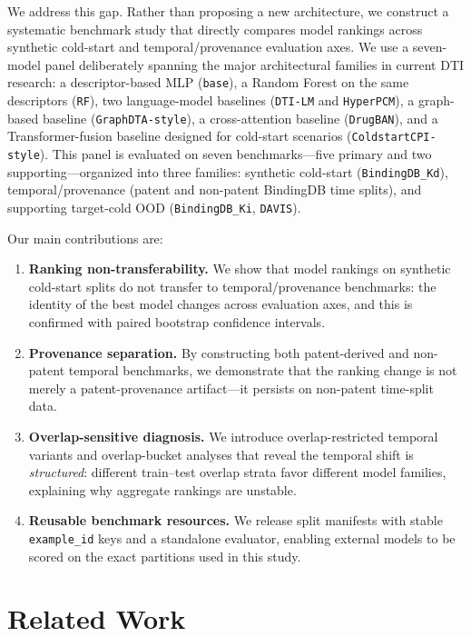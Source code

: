 \documentclass[referee,pdflatex,sn-basic,Numbered]{sn-jnl}
\begin{document}
We address this gap. Rather than proposing a new architecture, we construct a systematic benchmark study that directly compares model rankings across synthetic cold-start and temporal/provenance evaluation axes. We use a seven-model panel deliberately spanning the major architectural families in current DTI research: a descriptor-based MLP (\texttt{base}), a Random Forest on the same descriptors (\texttt{RF}), two language-model baselines (\texttt{DTI-LM} and \texttt{HyperPCM}), a graph-based baseline (\texttt{GraphDTA-style}), a cross-attention baseline (\texttt{DrugBAN}), and a Transformer-fusion baseline designed for cold-start scenarios (\texttt{ColdstartCPI-style}). This panel is evaluated on seven benchmarks—five primary and two supporting—organized into three families: synthetic cold-start (\texttt{BindingDB\_Kd}), temporal/provenance (patent and non-patent BindingDB time splits), and supporting target-cold OOD (\texttt{BindingDB\_Ki}, \texttt{DAVIS}).

Our main contributions are:
\begin{enumerate}
    \item \textbf{Ranking non-transferability.} We show that model rankings on synthetic cold-start splits do not transfer to temporal/provenance benchmarks: the identity of the best model changes across evaluation axes, and this is confirmed with paired bootstrap confidence intervals.
    \item \textbf{Provenance separation.} By constructing both patent-derived and non-patent temporal benchmarks, we demonstrate that the ranking change is not merely a patent-provenance artifact—it persists on non-patent time-split data.
    \item \textbf{Overlap-sensitive diagnosis.} We introduce overlap-restricted temporal variants and overlap-bucket analyses that reveal the temporal shift is \emph{structured}: different train--test overlap strata favor different model families, explaining why aggregate rankings are unstable.
    \item \textbf{Reusable benchmark resources.} We release split manifests with stable \texttt{example\_id} keys and a standalone evaluator, enabling external models to be scored on the exact partitions used in this study.
\end{enumerate}

\section{Related Work}
\label{sec:related}
\end{document}
